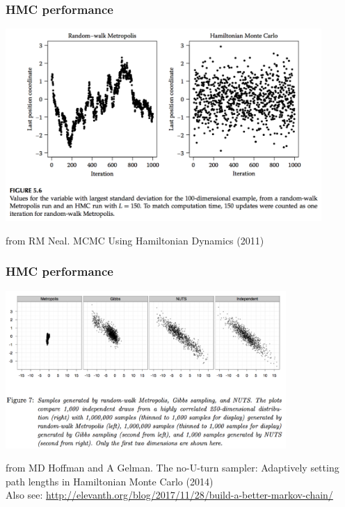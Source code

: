 \documentclass{beamer}
\begin{document}

\begin{frame}
  \frametitle{HMC performance}
  
  \begin{center}
    \includegraphics[width=0.9\textwidth]{graphics/samplingCompare2.pdf}
  \end{center}
{\scriptsize from RM Neal. MCMC Using Hamiltonian Dynamics (2011) \cite{neal2011}}

\end{frame}

\begin{frame}
  \frametitle{HMC performance}
  
  \begin{center}
    \includegraphics[width=0.8\textwidth]{graphics/samplingCompare1.pdf}
  \end{center}
{\scriptsize from MD Hoffman and A Gelman. The no-U-turn
  sampler: Adaptively setting path lengths in Hamiltonian Monte Carlo
  (2014) \cite{hoffman2014}\\
  Also see: \url{http://elevanth.org/blog/2017/11/28/build-a-better-markov-chain/}}

\end{frame}
\end{document}
